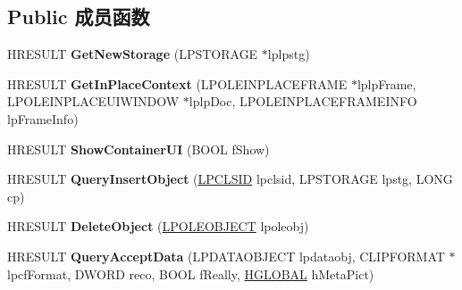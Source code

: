 \subsection*{Public 成员函数}
\begin{DoxyCompactItemize}
\item 
\mbox{\label{interface_i_rich_edit_ole_callback_a191813bbfad520f8143a46897897664d}} 
H\+R\+E\+S\+U\+LT {\bfseries Get\+New\+Storage} (L\+P\+S\+T\+O\+R\+A\+GE $\ast$lplpstg)
\item 
\mbox{\label{interface_i_rich_edit_ole_callback_aa663fd1f351cdd2125f6ee38035cced4}} 
H\+R\+E\+S\+U\+LT {\bfseries Get\+In\+Place\+Context} (L\+P\+O\+L\+E\+I\+N\+P\+L\+A\+C\+E\+F\+R\+A\+ME $\ast$lplp\+Frame, L\+P\+O\+L\+E\+I\+N\+P\+L\+A\+C\+E\+U\+I\+W\+I\+N\+D\+OW $\ast$lplp\+Doc, L\+P\+O\+L\+E\+I\+N\+P\+L\+A\+C\+E\+F\+R\+A\+M\+E\+I\+N\+FO lp\+Frame\+Info)
\item 
\mbox{\label{interface_i_rich_edit_ole_callback_a381f06e1137b614451b67a52d330a707}} 
H\+R\+E\+S\+U\+LT {\bfseries Show\+Container\+UI} (B\+O\+OL f\+Show)
\item 
\mbox{\label{interface_i_rich_edit_ole_callback_a58f09ab7b9914542d1e193e5e0f800ea}} 
H\+R\+E\+S\+U\+LT {\bfseries Query\+Insert\+Object} (\hyperlink{interface_g_u_i_d}{L\+P\+C\+L\+S\+ID} lpclsid, L\+P\+S\+T\+O\+R\+A\+GE lpstg, L\+O\+NG cp)
\item 
\mbox{\label{interface_i_rich_edit_ole_callback_ab6413645d14c7e60eb034bf162ece39f}} 
H\+R\+E\+S\+U\+LT {\bfseries Delete\+Object} (\hyperlink{struct___o_l_e_o_b_j_e_c_t}{L\+P\+O\+L\+E\+O\+B\+J\+E\+CT} lpoleobj)
\item 
\mbox{\label{interface_i_rich_edit_ole_callback_acc354fefd9fd390e83764dee6c44e0cb}} 
H\+R\+E\+S\+U\+LT {\bfseries Query\+Accept\+Data} (L\+P\+D\+A\+T\+A\+O\+B\+J\+E\+CT lpdataobj, C\+L\+I\+P\+F\+O\+R\+M\+AT $\ast$lpcf\+Format, D\+W\+O\+RD reco, B\+O\+OL f\+Really, \hyperlink{interfacevoid}{H\+G\+L\+O\+B\+AL} h\+Meta\+Pict)
\item 
\mbox{\label{interface_i_rich_edit_ole_callback_a10aca72b2af1e99d4d02d55faed2a124}} 

\end{DoxyCompactItemize}
